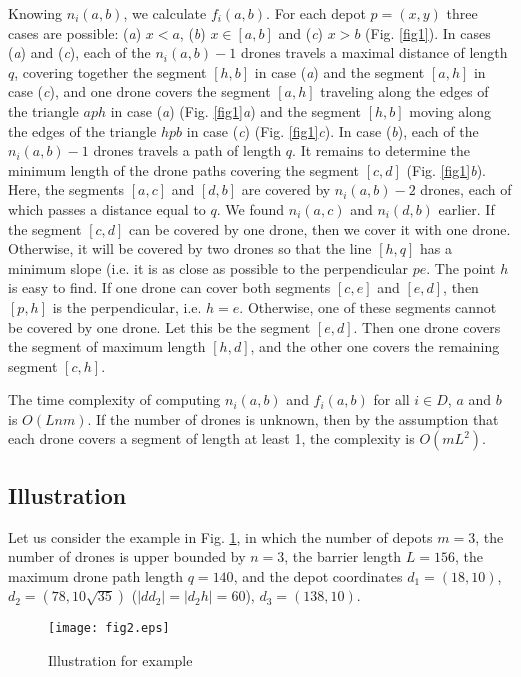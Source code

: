 \documentclass[runningheads]{llncs}
\begin{document}
Knowing $n_i(a,b)$, we calculate $f_i(a,b)$. For each depot $p=(x,y)$ three cases are possible: (\emph{a}) $x<a$, (\emph{b}) $x\in[a,b]$ and (\emph{c}) $x>b$ (Fig. \ref{fig1}). In cases (\emph{a}) and (\emph{c}), each of the $n_i(a,b)-1$ drones travels a maximal distance of length $q$, covering together the segment $[h,b]$ in case (\emph{a}) and the segment $[a,h]$ in case (\emph{c}), and one drone covers the segment $[a,h]$ traveling along the edges of the triangle $aph$ in case (\emph{a}) (Fig. \ref{fig1}\emph{a}) and the segment $[h,b]$ moving along the edges of the triangle $hpb$ in case (\emph{c}) (Fig. \ref{fig1}\emph{c}). In case (\emph{b}), each of the $n_i(a,b)-1$ drones travels a path of length $q$. It remains to determine the minimum length of the drone paths covering the segment $[c,d]$ (Fig. \ref{fig1}\emph{b}). Here, the segments $[a,c]$ and $[d,b]$ are covered by $n_i(a,b)-2$ drones, each of which passes a distance equal to $q$. We found $n_i(a,c)$ and $n_i(d,b)$ earlier. If the segment $[c,d]$ can be covered by one drone, then we cover it with one drone. Otherwise, it will be covered by two drones so that the line $[h,q]$ has a minimum slope (i.e. it is as close as possible to the perpendicular $pe$. The point $h$ is easy to find. If one drone can cover both segments $[c,e]$ and $[e,d]$, then $[p,h]$ is the perpendicular, i.e. $h=e$. Otherwise, one of these segments cannot be covered by one drone. Let this be the segment $[e,d]$. Then one drone covers the segment of maximum length $[h,d]$, and the other one covers the remaining segment $[c,h]$.

The time complexity of computing $n_i(a,b)$ and $f_i(a,b)$ for all $i\in D$, $a$ and $b$ is $O(Lnm)$. If the number of drones is unknown, then by the assumption that each drone covers a segment of length at least 1, the complexity is $O(mL^2)$.

\subsection{Illustration}
Let us consider the example in Fig. \ref{fig2}, in which the number of depots $m=3$, the number of drones is upper bounded by $n=3$, the barrier length $L=156$, the maximum drone path length $q=140$, and the depot coordinates $d_1=(18,10)$, $d_2=(78,10\sqrt{35})$ ($|dd_2|=|d_2h|=60$), $d_3=(138,10)$.

\begin{figure}
\centering
\texttt{[image: fig2.eps]}
\caption{Illustration for example}
\label{fig2}
\end{figure}
\end{document}
